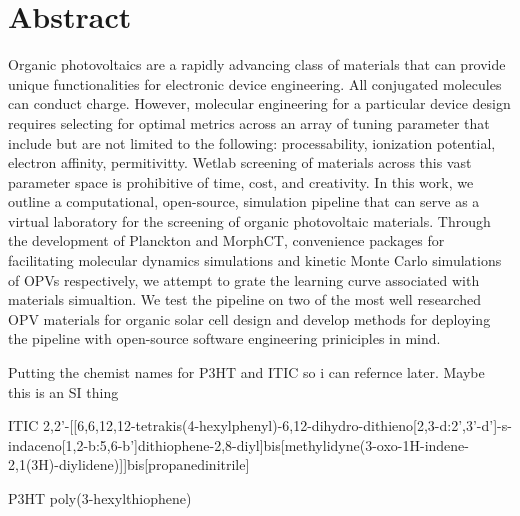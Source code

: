 
\chapter*{Abstract}

Organic photovoltaics are a rapidly advancing class of materials that can provide unique functionalities for
electronic device engineering.
All conjugated molecules can conduct charge. 
However, molecular engineering for a particular device design
requires selecting for optimal metrics across an array of tuning parameter that include but are
not limited to the following: processability, ionization potential, electron affinity, permitivitty. 
Wetlab screening of materials across
this vast parameter space is prohibitive of time, cost, and creativity. 
In this work, we outline a computational, open-source, simulation pipeline that can serve as a 
virtual laboratory for the screening of organic photovoltaic materials. 
Through the development of Planckton and MorphCT, convenience packages for facilitating molecular dynamics
simulations and kinetic Monte Carlo simulations of OPVs respectively, we attempt to grate the learning curve
associated with materials simualtion. We test the pipeline on
two of the most well researched OPV materials for organic solar cell design and develop methods for deploying
the pipeline with open-source software engineering priniciples in mind.

Putting the chemist names for P3HT and ITIC so i can refernce later. Maybe this is an SI thing

ITIC
2,2'-[[6,6,12,12-tetrakis(4-hexylphenyl)-6,12-dihydro-dithieno[2,3-d:2',3'-d']-s-indaceno[1,2-b:5,6-b']dithiophene-2,8-diyl]bis[methylidyne(3-oxo-1H-indene-2,1(3H)-diylidene)]]bis[propanedinitrile]

P3HT poly(3-hexylthiophene)




